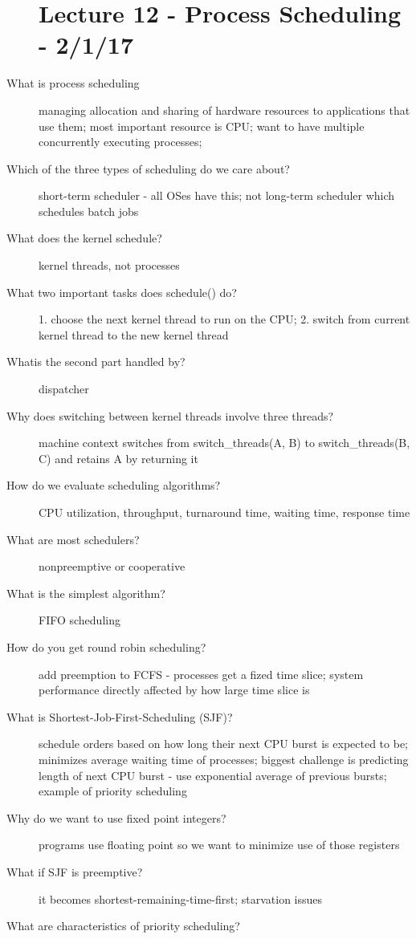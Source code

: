\documentclass[10pt]{article}
\begin{document}
\begin{description}
\section{Lecture 12 - Process Scheduling - 2/1/17}
\item[What is process scheduling]
  managing allocation and sharing of hardware resources to applications that use them;
  most important resource is CPU;
  want to have multiple concurrently executing processes;
\item[Which of the three types of scheduling do we care about?]
  short-term scheduler - all OSes have this;
  not long-term scheduler which schedules batch jobs
\item[What does the kernel schedule?]
  kernel threads, not processes
\item[What two important tasks does schedule() do?]
  1. choose the next kernel thread to run on the CPU;
  2. switch from current kernel thread to the new kernel thread
\item[Whatis the second part handled by?]
  dispatcher
\item[Why does switching between kernel threads involve three threads?]
  machine context switches from switch\_threads(A, B) to switch\_threads(B, C) and retains A by returning it
\item[How do we evaluate scheduling algorithms?]
  CPU utilization, throughput, turnaround time, waiting time, response time
\item[What are most schedulers?]
  nonpreemptive or cooperative
\item[What is the simplest algorithm?]
  FIFO scheduling
\item[How do you get round robin scheduling?]
  add preemption to FCFS - processes get a fized time slice;
  system performance directly affected by how large time slice is
\item[What is Shortest-Job-First-Scheduling (SJF)?]
  schedule orders based on how long their next CPU burst is expected to be;
  minimizes average waiting time of processes;
  biggest challenge is predicting length of next CPU burst - use exponential average of previous bursts;
  example of priority scheduling
\item[Why do we want to use fixed point integers?]
  programs use floating point so we want to minimize use of those registers
\item[What if SJF is preemptive?]
  it becomes shortest-remaining-time-first;
  starvation issues
\item[What are characteristics of priority scheduling?]

\end{description}
\end{document}

